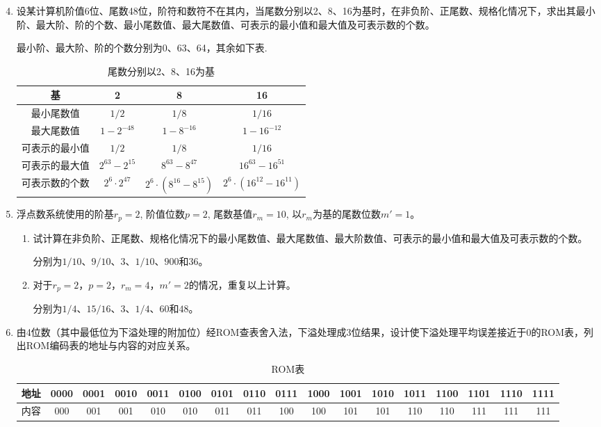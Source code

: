 \documentclass[a4paper,punct=CCT]{ctexbook}
\begin{document}
\begin{enumerate}
  \setcounter{enumi}{3}
\item 设某计算机阶值6位、尾数48位，阶符和数符不在其内，当尾数分别以2、8、16为基时，在非负阶、正尾数、规格化情况下，求出其最小阶、最大阶、阶的个数、最小尾数值、最大尾数值、可表示的最小值和最大值及可表示数的个数。

  最小阶、最大阶、阶的个数分别为0、63、64，其余如下表.

  \begin{table}[h]
    \centering
    \begin{tabular}{c|c|c|c}
      基 & 2 & 8 & 16 \\
      \hline
      最小尾数值 & \(1/2\) & \(1/8\) & \(1/16\) \\
      \hline
      最大尾数值 & \(1 - 2^{-48}\) & \(1- 8^{-16}\) & \(1 - 16^{-12}\) \\
      \hline
      可表示的最小值 & \(1/2\) & \(1/8\) & \(1/16\) \\
      \hline
      可表示的最大值 & \(2^{63} - 2^{15}\) & \(8^{63} - 8^{47}\) & \(16^{63} - 16^{51}\) \\
      \hline
      可表示数的个数 & \(2^6 \cdot 2^{47}\) & \(2^6 \cdot (8^{16} - 8^{15})\) & \(2^6 \cdot (16^{12} - 16^{11})\)
    \end{tabular}
    \caption{尾数分别以2、8、16为基}
  \end{table}

\item 浮点数系统使用的阶基\(r_p = 2\), 阶值位数\(p = 2\), 尾数基值\(r_m = 10\), 以\(r_m\)为基的尾数位数\(m' = 1\)。
  \begin{enumerate}
  \item 试计算在非负阶、正尾数、规格化情况下的最小尾数值、最大尾数值、最大阶数值、可表示的最小值和最大值及可表示数的个数。

    分别为\(1/10\)、\(9/10\)、\(3\)、\(1/10\)、\(900\)和\(36\)。

  \item 对于\(r_p = 2\)，\(p = 2\)，\(r_m = 4\)，\(m' = 2\)的情况，重复以上计算。

    分别为\(1/4\)、\(15/16\)、\(3\)、\(1/4\)、\(60\)和\(48\)。
  \end{enumerate}
  
\item 由4位数（其中最低位为下溢处理的附加位）经ROM查表舍入法，下溢处理成3位结果，设计使下溢处理平均误差接近于0的ROM表，列出ROM编码表的地址与内容的对应关系。

  \begin{table}[h]
    \centering
    \small
    \begin{tabular}{c|c|c|c|c|c|c|c|c|c|c|c|c|c|c|c|c}
      地址 & 0000 & 0001 & 0010 & 0011 & 0100 & 0101 & 0110 & 0111 & 1000 & 1001 & 1010 & 1011 & 1100 & 1101 & 1110 & 1111 \\
      \hline
      内容 & 000 & 001 & 001 & 010 & 010 & 011 & 011 & 100 & 100 & 101 & 101 & 110 & 110 & 111 & 111 & 111
    \end{tabular}
    \caption{ROM表}
  \end{table}
\end{enumerate}
\end{document}
